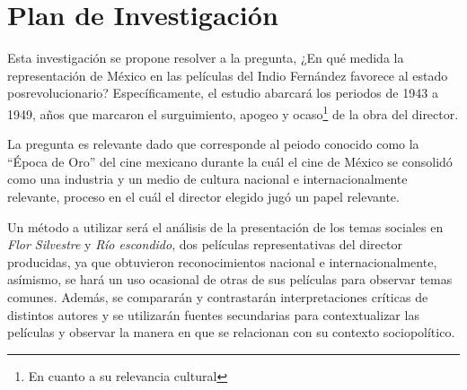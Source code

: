 \section{Plan de Investigación}
Esta investigación se propone resolver a la pregunta,
¿En qué medida la representación de México en las películas del Indio Fernández favorece al estado posrevolucionario? Específicamente, el estudio abarcará los periodos de 1943 a 1949, años que marcaron el surguimiento, apogeo y ocaso\footnote{En cuanto a su relevancia cultural} de la obra del director.%

La pregunta es relevante dado que corresponde al peiodo conocido como la ``Época de Oro'' del cine mexicano durante la cuál el cine de México se consolidó como una industria y un medio de cultura nacional e internacionalmente relevante, proceso en el cuál el director elegido jugó un papel relevante.%

Un método a utilizar será el análisis de la presentación de los temas sociales en \emph{Flor Silvestre} y  \emph{Río escondido}, dos películas representativas del director producidas, ya que obtuvieron reconocimientos nacional e internacionalmente, asímismo, se hará un uso ocasional de otras de sus películas para observar temas comunes. Además, se compararán y contrastarán interpretaciones críticas de distintos autores y se utilizarán fuentes secundarias para contextualizar las películas y observar la manera en que se relacionan con su contexto sociopolítico. 

\pagebreak
